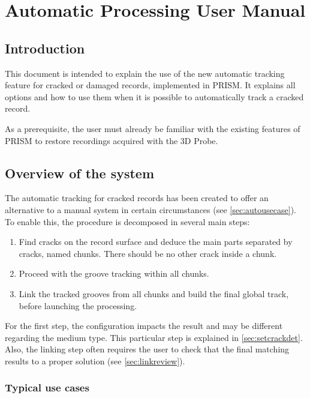 
\cleardoublepage
\chapter{Automatic Processing User Manual}
\label{chap:usermanauto}

\section{Introduction}

This document is intended to explain the use of the new automatic tracking feature for cracked or damaged records, implemented in PRISM. It explains all options and how to use them when it is possible to automatically track a cracked record.

As a prerequisite, the user must already be familiar with the existing features of PRISM to restore recordings acquired with the 3D Probe.

\section{Overview of the system}

The automatic tracking for cracked records has been created to offer an alternative to a manual system in certain circumstances (see \autoref{sec:autousecase}). To enable this, the procedure is decomposed in several main steps:

\begin{enumerate}
\item Find cracks on the record surface and deduce the main parts separated by cracks, named chunks. There should be no other crack inside a chunk.
\item Proceed with the groove tracking within all chunks.
\item Link the tracked grooves from all chunks and build the final global track, before launching the processing.
\end{enumerate}

For the first step, the configuration impacts the result and may be different regarding the medium type. This particular step is explained in \autoref{sec:setcrackdet}. Also, the linking step often requires the user to check that the final matching results to a proper solution (see \autoref{sec:linkreview}).

\subsection{Typical use cases}
\label{sec:autousecase}

